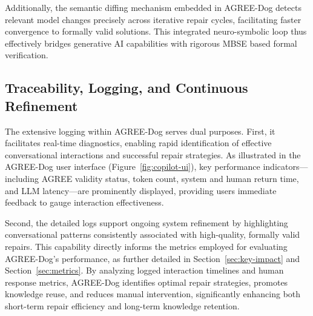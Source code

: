 Additionally, the semantic diffing mechanism embedded in AGREE-Dog detects relevant model changes precisely across iterative repair cycles, facilitating faster convergence to formally valid solutions. This integrated neuro-symbolic loop thus effectively bridges generative AI capabilities with rigorous MBSE based formal verification.


\subsection{Traceability, Logging, and Continuous Refinement}

The extensive logging within AGREE-Dog serves dual purposes. First, it facilitates real-time diagnostics, enabling rapid identification of effective conversational interactions and successful repair strategies. As illustrated in the AGREE-Dog user interface (Figure~\ref{fig:copilot-ui}), key performance indicators—including AGREE validity status, token count, system and human return time, and LLM latency—are prominently displayed, providing users immediate feedback to gauge interaction effectiveness.

Second, the detailed logs support ongoing system refinement by highlighting conversational patterns consistently associated with high-quality, formally valid repairs. This capability directly informs the metrics employed for evaluating AGREE-Dog’s performance, as further detailed in Section~\ref{sec:key-impact} and Section~\ref{sec:metrics}. By analyzing logged interaction timelines and human response metrics, AGREE-Dog identifies optimal repair strategies, promotes knowledge reuse, and reduces manual intervention, significantly enhancing both short-term repair efficiency and long-term knowledge retention.




